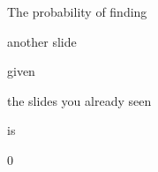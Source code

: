 \documentclass[xcolor=table]{beamer}
\begin{document}

\begin{frame}[plain]
	
	\begin{center}
		\Huge 
		The probability of finding 
		
		another slide 
		
		given 
		
		the slides you already seen 
		
		is 
		
		0
	\end{center}
	
\end{frame}
\end{document}
